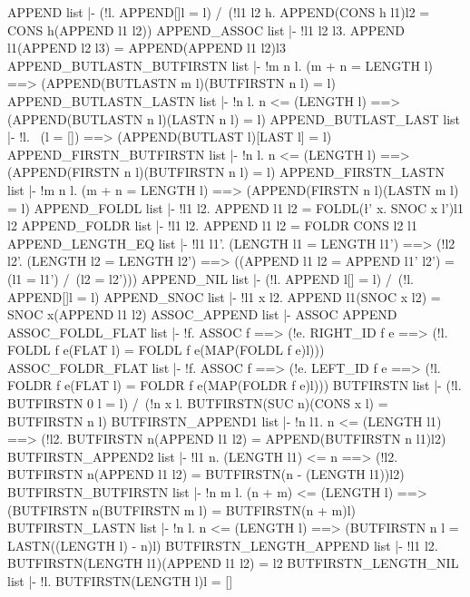 \THEOREM APPEND list
|- (!l. APPEND[]l = l) /\
   (!l1 l2 h. APPEND(CONS h l1)l2 = CONS h(APPEND l1 l2))
\ENDTHEOREM
\THEOREM APPEND\_ASSOC list
|- !l1 l2 l3. APPEND l1(APPEND l2 l3) = APPEND(APPEND l1 l2)l3
\ENDTHEOREM
\THEOREM APPEND\_BUTLASTN\_BUTFIRSTN list
|- !m n l.
    (m + n = LENGTH l) ==> (APPEND(BUTLASTN m l)(BUTFIRSTN n l) = l)
\ENDTHEOREM
\THEOREM APPEND\_BUTLASTN\_LASTN list
|- !n l. n <= (LENGTH l) ==> (APPEND(BUTLASTN n l)(LASTN n l) = l)
\ENDTHEOREM
\THEOREM APPEND\_BUTLAST\_LAST list
|- !l. ~(l = []) ==> (APPEND(BUTLAST l)[LAST l] = l)
\ENDTHEOREM
\THEOREM APPEND\_FIRSTN\_BUTFIRSTN list
|- !n l. n <= (LENGTH l) ==> (APPEND(FIRSTN n l)(BUTFIRSTN n l) = l)
\ENDTHEOREM
\THEOREM APPEND\_FIRSTN\_LASTN list
|- !m n l. (m + n = LENGTH l) ==> (APPEND(FIRSTN n l)(LASTN m l) = l)
\ENDTHEOREM
\THEOREM APPEND\_FOLDL list
|- !l1 l2. APPEND l1 l2 = FOLDL(\l' x. SNOC x l')l1 l2
\ENDTHEOREM
\THEOREM APPEND\_FOLDR list
|- !l1 l2. APPEND l1 l2 = FOLDR CONS l2 l1
\ENDTHEOREM
\THEOREM APPEND\_LENGTH\_EQ list
|- !l1 l1'.
    (LENGTH l1 = LENGTH l1') ==>
    (!l2 l2'.
      (LENGTH l2 = LENGTH l2') ==>
      ((APPEND l1 l2 = APPEND l1' l2') = (l1 = l1') /\ (l2 = l2')))
\ENDTHEOREM
\THEOREM APPEND\_NIL list
|- (!l. APPEND l[] = l) /\ (!l. APPEND[]l = l)
\ENDTHEOREM
\THEOREM APPEND\_SNOC list
|- !l1 x l2. APPEND l1(SNOC x l2) = SNOC x(APPEND l1 l2)
\ENDTHEOREM
\THEOREM ASSOC\_APPEND list
|- ASSOC APPEND
\ENDTHEOREM
\THEOREM ASSOC\_FOLDL\_FLAT list
|- !f.
    ASSOC f ==>
    (!e.
      RIGHT_ID f e ==>
      (!l. FOLDL f e(FLAT l) = FOLDL f e(MAP(FOLDL f e)l)))
\ENDTHEOREM
\THEOREM ASSOC\_FOLDR\_FLAT list
|- !f.
    ASSOC f ==>
    (!e.
      LEFT_ID f e ==>
      (!l. FOLDR f e(FLAT l) = FOLDR f e(MAP(FOLDR f e)l)))
\ENDTHEOREM
\THEOREM BUTFIRSTN list
|- (!l. BUTFIRSTN 0 l = l) /\
   (!n x l. BUTFIRSTN(SUC n)(CONS x l) = BUTFIRSTN n l)
\ENDTHEOREM
\THEOREM BUTFIRSTN\_APPEND1 list
|- !n l1.
    n <= (LENGTH l1) ==>
    (!l2. BUTFIRSTN n(APPEND l1 l2) = APPEND(BUTFIRSTN n l1)l2)
\ENDTHEOREM
\THEOREM BUTFIRSTN\_APPEND2 list
|- !l1 n.
    (LENGTH l1) <= n ==>
    (!l2. BUTFIRSTN n(APPEND l1 l2) = BUTFIRSTN(n - (LENGTH l1))l2)
\ENDTHEOREM
\THEOREM BUTFIRSTN\_BUTFIRSTN list
|- !n m l.
    (n + m) <= (LENGTH l) ==>
    (BUTFIRSTN n(BUTFIRSTN m l) = BUTFIRSTN(n + m)l)
\ENDTHEOREM
\THEOREM BUTFIRSTN\_LASTN list
|- !n l. n <= (LENGTH l) ==> (BUTFIRSTN n l = LASTN((LENGTH l) - n)l)
\ENDTHEOREM
\THEOREM BUTFIRSTN\_LENGTH\_APPEND list
|- !l1 l2. BUTFIRSTN(LENGTH l1)(APPEND l1 l2) = l2
\ENDTHEOREM
\THEOREM BUTFIRSTN\_LENGTH\_NIL list
|- !l. BUTFIRSTN(LENGTH l)l = []
\ENDTHEOREM
